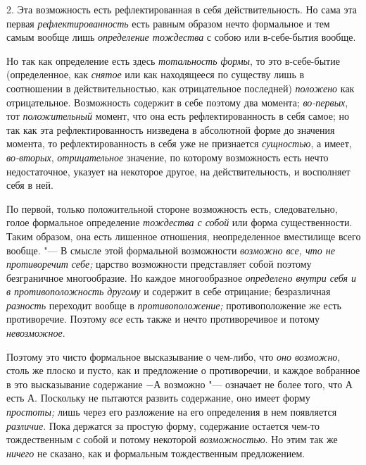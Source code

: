 2. Эта возможность есть рефлектированная в себя действительность. Но сама
эта первая {\em рефлектированность} есть равным образом
нечто формальное и тем самым вообще лишь
{\em определение тождества} с собою или в-себе-бытия вообще.

Но так как определение есть здесь {\em тотальность
формы}, то это в-себе-бытие (определенное, как
{\em снятое} или как находящееся по существу лишь в
соотношении в действительностью, как отрицательное последней)
{\em положено} как отрицательное. Возможность содержит
в себе поэтому два момента; {\em во-первых}, тот
{\em положительный} момент, что она есть
рефлектированность в себя самое; но так как эта рефлектированность
низведена в абсолютной форме до значения момента, то рефлектированность в
себя уже не признается {\em сущностью}, а имеет,
{\em во-вторых}, {\em отрицательное} значение, по которому возможность
есть нечто недостаточное, указует на некоторое другое, на действительность,
и восполняет себя в ней.

По первой, только положительной стороне возможность есть, следовательно,
голое формальное определение {\em тождества с собой}
или форма существенности. Таким образом, она есть лишенное отношения,
неопределенное вместилище всего вообще. "--- В смысле этой формальной
возможности {\em возможно все, что не противоречит
себе;} царство возможности представляет собой поэтому безграничное
многообразие. Но каждое многообразное {\em определено
внутри себя и в противоположность другому} и содержит в себе отрицание;
безразличная {\em разность} переходит вообще в
{\em противоположение;} противоположение же есть
противоречие. Поэтому {\em все} есть также и нечто
противоречивое и потому {\em невозможное}.

Поэтому это чисто формальное высказывание о чем-либо, что
{\em оно возможно}, столь же плоско и пусто, как и
предложение о противоречии, и каждое вобранное в это высказывание
содержание $-А$ возможно "--- означает не более того, что $А$
есть $А$. Поскольку не пытаются развить содержание, оно имеет форму
{\em простоты;} лишь через его разложение на его
определения в нем появляется {\em различие}. Пока
держатся за простую форму, содержание остается чем-то тождественным с собой
и потому некоторой {\em возможностью}. Но этим так же
{\em ничего} не сказано, как и формальным тождественным
предложением.

